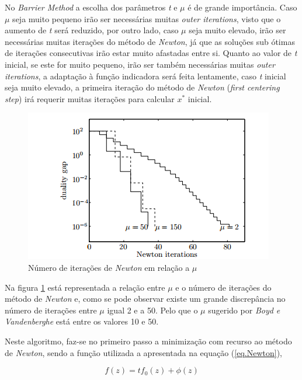 \documentclass[a4paper]{IEEEtran}
\begin{document}
No \textit{Barrier Method} a escolha dos parâmetros \textit{t} e $\mu$ é de grande importância. Caso $\mu$ seja muito pequeno irão ser necessárias muitas \textit{outer iterations}, visto que o aumento de \textit{t} será reduzido, por outro lado, caso $\mu$ seja muito elevado, irão ser necessárias muitas iterações do método de \textit{Newton}, já que as soluções sub ótimas de iterações consecutivas irão estar muito afastadas entre si. Quanto ao valor de \textit{t} inicial, se este for muito pequeno, irão ser também necessárias muitas \textit{outer iterations}, a adaptação à função indicadora será feita lentamente, caso \textit{t} inicial seja muito elevado, a primeira iteração do método de \textit{Newton} (\textit{first centering step}) irá requerir muitas iterações para calcular $x^\ast$ inicial.

\begin{figure}[htp]
\captionsetup{font=scriptsize}  
  \centering
  \includegraphics[width=0.9\columnwidth]{./iterations_dua_gap}
  \caption{Número de iterações de \textit{Newton} em relação a $\mu$}
  \label{fig:gamma}
\end{figure}

Na figura \ref{fig:gamma} está representada a relação entre $\mu$ e o número de iterações do método de \textit{Newton} e, como se pode observar existe um grande discrepância no número de iterações entre $\mu$ igual 2 e a 50. Pelo que o $\mu$ sugerido por \textit{Boyd e Vandenberghe} está entre os valores 10 e 50.

Neste algoritmo, faz-se no primeiro passo a minimização com recurso ao método de \textit{Newton}, sendo a função utilizada a apresentada na equação (\ref{eq.Newton}),

\begin{equation}
\label{eq.Newton}
f(z) = t f_0 (z) + \phi (z)
\end{equation}
\end{document}
